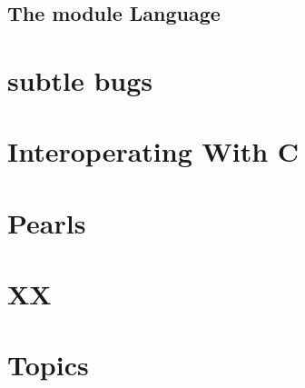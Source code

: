 \documentclass[svgnames,12pt,a4paper]{book}
\begin{document}
\section{The module Language}
\label{sec:module-language}

\chapter{subtle bugs}
\label{sec:subtle-bugs}





\chapter{Interoperating With C}
\label{sec:inter-with-c}


\chapter{Pearls}





\chapter{XX}


\chapter{Topics}




\end{document}
